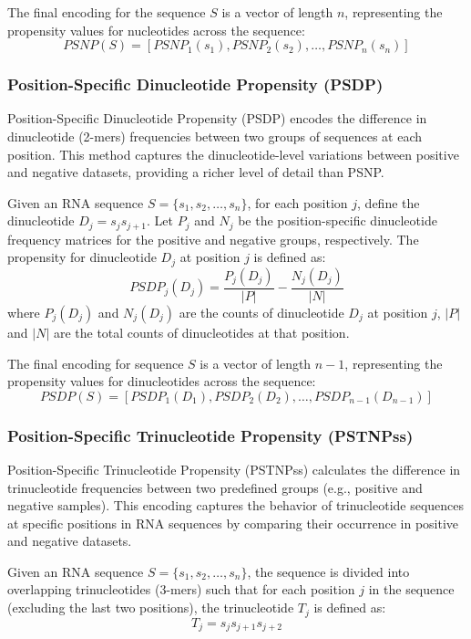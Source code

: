       The final encoding for the sequence $S$ is a vector of length $n$, representing the propensity values for nucleotides across the sequence:
      \[
        PSNP(S) = [PSNP_1(s_1), PSNP_2(s_2), \dots, PSNP_n(s_n)]
      \]

    \subsubsection{Position-Specific Dinucleotide Propensity (PSDP)}\label{subsubsec:PSDP}
      Position-Specific Dinucleotide Propensity (PSDP) encodes the difference in dinucleotide (2-mers) frequencies between two groups of sequences at each position.
      This method captures the dinucleotide-level variations between positive and negative datasets, providing a richer level of detail than PSNP.

      Given an RNA sequence $S = \{s_1, s_2, \dots, s_n\}$, for each position $j$, define the dinucleotide $D_j = s_j s_{j+1}$.
      Let $P_j$ and $N_j$ be the position-specific dinucleotide frequency matrices for the positive and negative groups, respectively.
      The propensity for dinucleotide $D_j$ at position $j$ is defined as:
      \[
        PSDP_j(D_j) = \frac{P_j(D_j)}{|P|} - \frac{N_j(D_j)}{|N|}
      \]
      where $P_j(D_j)$ and $N_j(D_j)$ are the counts of dinucleotide $D_j$ at position $j$, $|P|$ and $|N|$ are the total counts of dinucleotides at that position.

      The final encoding for sequence $S$ is a vector of length $n-1$, representing the propensity values for dinucleotides across the sequence:
      \[
        PSDP(S) = [PSDP_1(D_1), PSDP_2(D_2), \dots, PSDP_{n-1}(D_{n-1})]
      \]

    \subsubsection{Position-Specific Trinucleotide Propensity (PSTNPss)}\label{subsubsec:pstnpss}
      Position-Specific Trinucleotide Propensity (PSTNPss) calculates the difference in trinucleotide frequencies between two predefined groups (e.g., positive and negative samples).
      This encoding captures the behavior of trinucleotide sequences at specific positions in RNA sequences by comparing their occurrence in positive and negative datasets.

      Given an RNA sequence $S = \{s_1, s_2, \dots, s_n\}$, the sequence is divided into overlapping trinucleotides (3-mers) such that for each position $j$ in the sequence (excluding the last two positions), the trinucleotide $T_j$ is defined as:
      \[
        T_j = s_j s_{j+1} s_{j+2}
      \]

